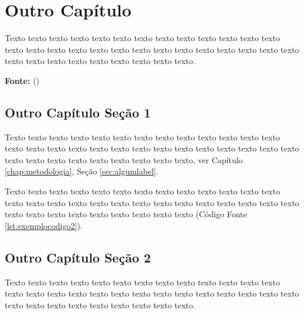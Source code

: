 \chapter{Outro Capítulo}
\label{chap:capitulo1}

Texto texto texto texto texto texto texto texto texto texto texto texto texto texto texto texto texto texto texto texto texto texto texto texto texto texto texto texto texto texto texto texto texto texto texto texto.



\hfill
\begin{minipage}[t]{.65\textwidth}
\ABNTEXfontereduzida\selectfont\textbf{Fonte:} \citeauthor{universidadejava2020}  (\citeyear{universidadejava2020}) 
\end{minipage}




\section{Outro Capítulo Seção 1}
\label{sec:label}
Texto texto texto texto texto texto texto texto texto texto texto texto texto texto texto texto texto texto texto texto texto texto texto texto texto texto texto texto texto texto texto texto texto texto texto texto, ver Capítulo \ref{chap:metodologia}, Seção \ref{sec:algumlabel}.

Texto texto texto texto texto texto texto texto texto texto texto texto texto texto texto texto texto texto texto texto texto texto texto texto texto texto texto texto texto texto texto texto texto texto texto texto (Código Fonte \ref{lst:exemplocodigo2}).


\section{Outro Capítulo Seção 2}
\label{sec:outralabel}

Texto texto texto texto texto texto texto texto texto texto texto texto texto texto texto texto texto texto texto texto texto texto texto texto texto texto texto texto texto texto texto texto texto texto texto texto.

